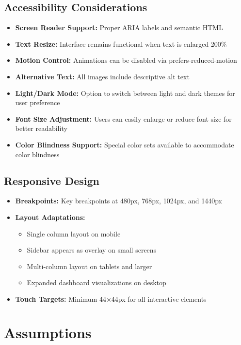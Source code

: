 \documentclass[a4paper, 11pt]{scrreprt}
\begin{document}
\section{Accessibility Considerations}
\begin{itemize}
    \item \textbf{Screen Reader Support:} Proper ARIA labels and semantic HTML
    \item \textbf{Text Resize:} Interface remains functional when text is enlarged 200\%
    \item \textbf{Motion Control:} Animations can be disabled via prefers-reduced-motion
    \item \textbf{Alternative Text:} All images include descriptive alt text
    \item \textbf{Light/Dark Mode:} Option to switch between light and dark themes for user preference
    \item \textbf{Font Size Adjustment:} Users can easily enlarge or reduce font size for better readability
    \item \textbf{Color Blindness Support:} Special color sets available to accommodate color blindness
\end{itemize}

\section{Responsive Design}
\begin{itemize}
    \item \textbf{Breakpoints:} Key breakpoints at 480px, 768px, 1024px, and 1440px
    \item \textbf{Layout Adaptations:} 
    \begin{itemize}
        \item Single column layout on mobile
        \item Sidebar appears as overlay on small screens
        \item Multi-column layout on tablets and larger
        \item Expanded dashboard visualizations on desktop
    \end{itemize}
    \item \textbf{Touch Targets:} Minimum 44$\times$44px for all interactive elements
\end{itemize}

\chapter{Assumptions}
\end{document}
